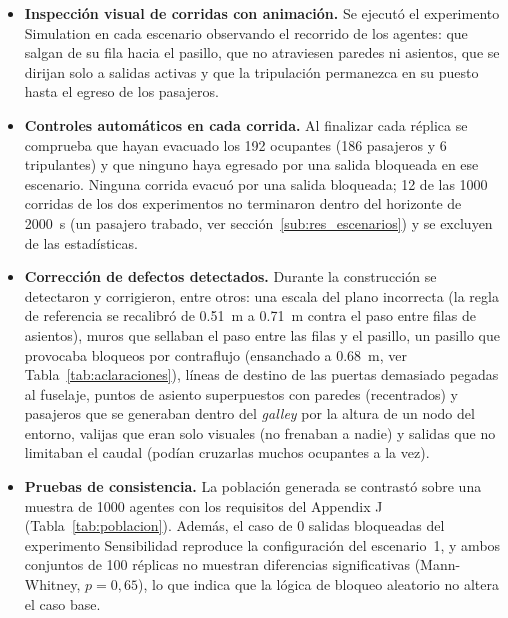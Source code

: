 \documentclass[a4paper, 11pt]{article}
\begin{document}
\begin{itemize}[leftmargin=2em]
    \item \textbf{Inspecci\'on visual de corridas con animaci\'on.} Se ejecut\'o el
          experimento Simulation en cada escenario observando el recorrido de los
          agentes: que salgan de su fila hacia el pasillo, que no atraviesen
          paredes ni asientos, que se dirijan solo a salidas activas y que la
          tripulaci\'on permanezca en su puesto hasta el egreso de los pasajeros.
    \item \textbf{Controles autom\'aticos en cada corrida.} Al finalizar cada
          r\'eplica se comprueba que hayan evacuado los 192 ocupantes (186
          pasajeros y 6 tripulantes) y que ninguno haya egresado por una salida
          bloqueada en ese escenario. Ninguna corrida evacu\'o por una salida
          bloqueada; 12 de las 1000 corridas de los dos experimentos no
          terminaron dentro del horizonte de 2000~s (un pasajero trabado, ver
          secci\'on~\ref{sub:res_escenarios}) y se excluyen de las estad\'isticas.
    \item \textbf{Correcci\'on de defectos detectados.} Durante la construcci\'on
          se detectaron y corrigieron, entre otros: una escala del plano
          incorrecta (la regla de referencia se recalibr\'o de 0.51~m a 0.71~m
          contra el paso entre filas de asientos), muros que sellaban el paso
          entre las filas y el pasillo, un pasillo que provocaba bloqueos por
          contraflujo (ensanchado a 0.68~m, ver Tabla~\ref{tab:aclaraciones}),
          l\'ineas de destino de las puertas demasiado pegadas al fuselaje,
          puntos de asiento superpuestos con paredes (recentrados) y pasajeros
          que se generaban dentro del \textit{galley} por la altura de un nodo
          del entorno, valijas que eran solo visuales (no frenaban a nadie) y
          salidas que no limitaban el caudal (pod\'ian cruzarlas muchos
          ocupantes a la vez).
    \item \textbf{Pruebas de consistencia.} La poblaci\'on generada se contrast\'o
          sobre una muestra de 1000 agentes con los requisitos del Appendix J
          (Tabla~\ref{tab:poblacion}). Adem\'as, el caso de 0 salidas bloqueadas
          del experimento Sensibilidad reproduce la configuraci\'on del
          escenario~1, y ambos conjuntos de 100 r\'eplicas no muestran diferencias
          significativas (Mann-Whitney, $p = 0{,}65$), lo que indica que la
          l\'ogica de bloqueo aleatorio no altera el caso base.
\end{itemize}
\end{document}
